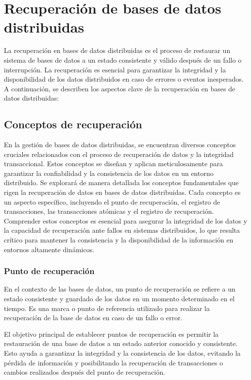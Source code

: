 \section{Recuperación de bases de datos distribuidas}
\noindent
La recuperación en bases de datos distribuidas es el proceso de restaurar un sistema de bases de datos a un estado consistente y válido después de un fallo o interrupción. La recuperación es esencial para garantizar la integridad y la disponibilidad de los datos distribuidos en caso de errores o eventos inesperados. A continuación, se describen los aspectos clave de la recuperación en bases de datos distribuidas:

\subsection{Conceptos de recuperación}
\noindent
En la gestión de bases de datos distribuidas, se encuentran diversos conceptos cruciales relacionados con el proceso de recuperación de datos y la integridad transaccional. Estos conceptos se diseñan y aplican meticulosamente para garantizar la confiabilidad y la consistencia de los datos en un entorno distribuido. Se explorará de manera detallada los conceptos fundamentales que rigen la recuperación de datos en bases de datos distribuidas. Cada concepto es un aspecto específico, incluyendo el punto de recuperación, el registro de transacciones, las transacciones atómicas y el registro de recuperación. Comprender estos conceptos es esencial para asegurar la integridad de los datos y la capacidad de recuperación ante fallos en sistemas distribuidos, lo que resulta crítico para mantener la consistencia y la disponibilidad de la información en entornos altamente dinámicos.

\subsubsection{Punto de recuperación}
\noindent
En el contexto de las bases de datos, un punto de recuperación se refiere a un estado consistente y guardado de los datos en un momento determinado en el tiempo. Es una marca o punto de referencia utilizado para realizar la recuperación de la base de datos en caso de un fallo o error.

El objetivo principal de establecer puntos de recuperación es permitir la restauración de una base de datos a un estado anterior conocido y consistente. Esto ayuda a garantizar la integridad y la consistencia de los datos, evitando la pérdida de información y posibilitando la recuperación de transacciones o cambios realizados después del punto de recuperación.


